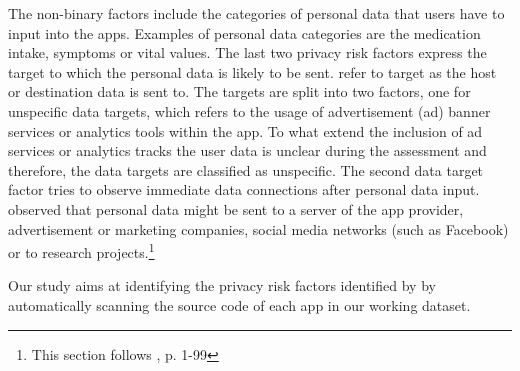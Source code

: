 \documentclass[
	a4paper,
	oneside,
	12pt,
	liststotocnumbered
]{article}
\let\cite\textcite
\begin{document}
The non-binary factors include the categories of personal data that users have to input into the \mH apps. Examples of personal data categories are the medication intake, symptoms or vital values.
The last two privacy risk factors express the target to which the personal data is likely to be sent. 
\cite{Bruggemann2016} refer to target as the host or destination data is sent to.
The targets are split into two factors, one for unspecific data targets, which refers to the usage of advertisement (ad) banner services or analytics tools within the app. 
To what extend the inclusion of ad services or analytics tracks the user data is unclear during the assessment and therefore, the data targets are classified as unspecific.
The second data target factor tries to observe immediate data connections after personal data input. 
\cite{Bruggemann2016} observed that personal data might be sent to a server of the app provider, advertisement or marketing companies, social media networks (such as Facebook) or to research projects.\footnote{This section follows \cite{Bruggemann2016}, p. 1-99}

Our study aims at identifying the privacy risk factors identified by \cite{Bruggemann2016} by automatically scanning the source code of each app in our working dataset. 
\end{document}
